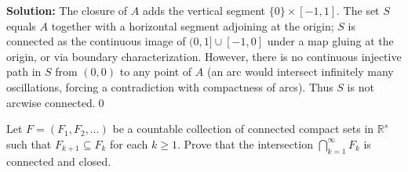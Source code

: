     

\bigskip\noindent\textbf{Solution:}
The closure of $A$ adds the vertical segment $\{0\}\times[-1,1]$. The set $S$ equals $A$ together with a horizontal segment adjoining at the origin; $S$ is connected as the continuous image of $(0,1]\cup[-1,0]$ under a map gluing at the origin, or via boundary characterization. However, there is no continuous injective path in $S$ from $(0,0)$ to any point of $A$ (an arc would intersect infinitely many oscillations, forcing a contradiction with compactness of arcs). Thus $S$ is not arcwise connected.\qed



\begin{problembox}
\begin{problemstatement}
Let $F = (F_1, F_2, \ldots)$ be a countable collection of connected compact sets in $\mathbb{R}^s$ such that $F_{k+1} \subseteq F_k$ for each $k \geq 1$. Prove that the intersection $\bigcap_{k=1}^{\infty} F_k$ is connected and closed.
\end{problemstatement}
\end{problembox}

